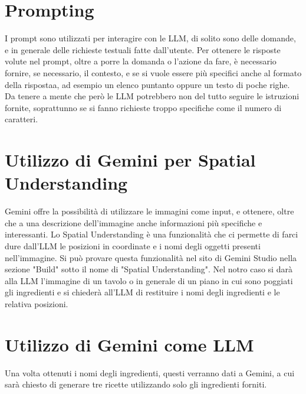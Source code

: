\section{Prompting}
I prompt sono utilizzati per interagire con le LLM, di solito sono delle domande, e in generale delle richieste testuali fatte dall'utente. Per ottenere le risposte volute nel prompt, oltre a porre la domanda o l'azione da fare, è necessario fornire, se necessario, il contesto, e se si vuole essere più specifici anche al formato della rispostaa, ad esempio un elenco puntanto oppure un testo di poche righe. Da tenere a mente che però le LLM potrebbero non del tutto seguire le istruzioni fornite, soprattunno se si fanno richieste troppo specifiche come il numero di caratteri. \cite{PromptingNvidia} \cite{PromptingGoogle}

\section{Utilizzo di Gemini per Spatial Understanding}
Gemini offre la possibilità di utilizzare le immagini come input, e ottenere, oltre che a una descrizione dell'immagine anche informazioni più specifiche e interessanti. Lo Spatial Understanding è una funzionalità che ci permette di farci dure dall'LLM le posizioni in coordinate e i nomi degli oggetti presenti nell'immagine. Si può provare questa funzionalità nel sito di Gemini Studio nella sezione "Build" sotto il nome di "Spatial Understanding". Nel notro caso si darà alla LLM l'immagine di un tavolo o in generale di un piano in cui sono poggiati gli ingredienti e si chiederà all'LLM di restituire i nomi degli ingredienti e le relativa posizioni.
\section{Utilizzo di Gemini come LLM}
Una volta ottenuti i nomi degli ingredienti, questi verranno dati a Gemini, a cui sarà chiesto di generare tre ricette utilizzando solo gli ingredienti forniti.

